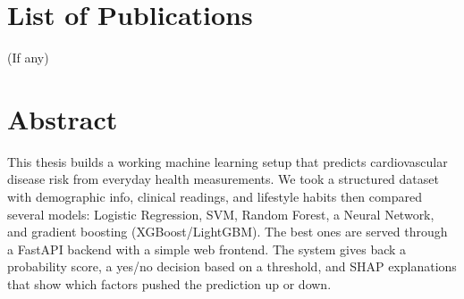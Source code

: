 \documentclass[12pt, a4paper, oneside]{book}
\begin{document}
\clearpage
\thispagestyle{plain}
\chapter*{List of Publications}
(If any)

\clearpage
\thispagestyle{plain}
\chapter*{Abstract}
This thesis builds a working machine learning setup that predicts cardiovascular disease risk from everyday health measurements. We took a structured dataset with demographic info, clinical readings, and lifestyle habits then compared several models: Logistic Regression, SVM, Random Forest, a Neural Network, and gradient boosting (XGBoost/LightGBM). The best ones are served through a FastAPI backend with a simple web frontend. The system gives back a probability score, a yes/no decision based on a threshold, and SHAP explanations that show which factors pushed the prediction up or down.

\mainmatter
{}
\setcounter{page}{1}

\end{document}
